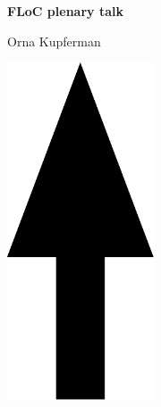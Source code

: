 \documentclass[a3paper]{article}
\begin{document}
\printGenericVSLHeaderBig
\begin{center}
\begin{vsltext}{3cm}{3.5cm}

    \vspace{1.5cm}

    \textbf{FLoC plenary talk} 

    Orna Kupferman

    \vspace{2cm}

    \includegraphics[height=10cm,keepaspectratio=true]{arrow_keynote.pdf}

\end{vsltext}

\end{center}
\end{document}

